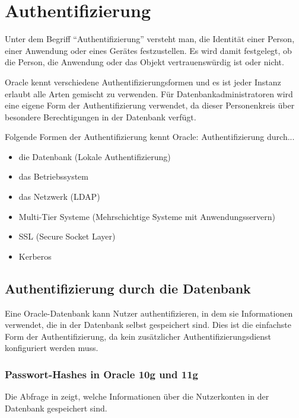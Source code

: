     \section{Authentifizierung}
      Unter dem Begriff \enquote{Authentifizierung} versteht man, die Identit\"at einer Person, einer Anwendung oder eines Ge\-r\"a\-tes festzustellen. Es wird damit festgelegt, ob die Person, die Anwendung oder das Objekt vertrauensw\"urdig ist oder nicht.

      Oracle kennt verschiedene Authentifizierungsformen und es ist jeder Instanz erlaubt alle Arten gemischt zu verwenden. F\"ur Datenbankadministratoren wird eine eigene Form der Authentifizierung verwendet, da dieser Personenkreis \"uber besondere Berechtigungen in der Datenbank verf\"ugt.

      Folgende Formen der Authentifizierung kennt Oracle: Authentifizierung durch...
      \begin{itemize}
        \item die Datenbank (Lokale Authentifizierung)
        \item das Betriebssystem
        \item das Netzwerk (LDAP)
        \item Multi-Tier Systeme (Mehrschichtige Systeme mit Anwendungsservern)
        \item SSL (Secure Socket Layer)
        \item Kerberos
      \end{itemize}
      \subsection{Authentifizierung durch die Datenbank}
        Eine Oracle-Datenbank kann Nutzer authentifizieren, in dem sie
        Informationen verwendet, die in der Datenbank selbst gespeichert sind.
        Dies ist die einfachste Form der Authentifizierung, da kein zusätzlicher
        Authentifizierungsdienst konfiguriert werden muss.
        \subsubsection{Passwort-Hashes in Oracle 10g und 11g}
        Die Abfrage in  zeigt, welche Informationen \"uber
        die Nutzerkonten in der Datenbank gespeichert sind.

